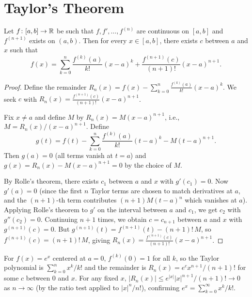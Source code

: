 \documentclass[11pt,a4paper]{article}
\begin{document}
\section{Taylor's Theorem}
\label{sec:taylor}

\begin{theorem}
\label{thm:taylor}
Let $f \colon [a, b] \to \mathbb{R}$ be such that $f, f', \ldots, f^{(n)}$ are
continuous on $[a, b]$ and $f^{(n+1)}$ exists on $(a, b)$. Then for every
$x \in [a, b]$, there exists $c$ between $a$ and $x$ such that
\[
  f(x) = \sum_{k=0}^{n} \frac{f^{(k)}(a)}{k!}(x - a)^k
  + \frac{f^{(n+1)}(c)}{(n+1)!}(x - a)^{n+1}.
\]
\end{theorem}

\begin{proof}
Define the remainder $R_n(x) = f(x) - \sum_{k=0}^n
\frac{f^{(k)}(a)}{k!}(x-a)^k$. We seek $c$ with
$R_n(x) = \frac{f^{(n+1)}(c)}{(n+1)!}(x-a)^{n+1}$.

Fix $x \neq a$ and define $M$ by $R_n(x) = M(x - a)^{n+1}$, i.e.,
$M = R_n(x)/(x - a)^{n+1}$. Define
\[
  g(t) = f(t) - \sum_{k=0}^{n} \frac{f^{(k)}(a)}{k!}(t - a)^k
  - M(t - a)^{n+1}.
\]
Then $g(a) = 0$ (all terms vanish at $t = a$) and $g(x) = R_n(x) -
M(x - a)^{n+1} = 0$ by the choice of $M$.

By Rolle's theorem, there exists $c_1$ between $a$ and $x$ with
$g'(c_1) = 0$. Now $g'(a) = 0$ (since the first $n$ Taylor terms are
chosen to match derivatives at $a$, and the $(n+1)$-th term contributes
$(n+1)M(t-a)^n$ which vanishes at $a$). Applying Rolle's theorem to
$g'$ on the interval between $a$ and $c_1$, we get $c_2$ with
$g''(c_2) = 0$. Continuing $n+1$ times, we obtain $c = c_{n+1}$ between
$a$ and $x$ with $g^{(n+1)}(c) = 0$. But
$g^{(n+1)}(t) = f^{(n+1)}(t) - (n+1)!\,M$,
so $f^{(n+1)}(c) = (n+1)!\,M$, giving
$R_n(x) = \frac{f^{(n+1)}(c)}{(n+1)!}(x - a)^{n+1}$.
\end{proof}

\begin{example}
\label{ex:taylor_exp}
For $f(x) = e^x$ centered at $a = 0$, $f^{(k)}(0) = 1$ for all $k$,
so the Taylor polynomial is $\sum_{k=0}^n x^k / k!$ and the remainder
is $R_n(x) = e^c x^{n+1}/(n+1)!$ for some $c$ between $0$ and $x$.
For any fixed $x$, $|R_n(x)| \le e^{|x|} |x|^{n+1}/(n+1)! \to 0$
as $n \to \infty$ (by the ratio test applied to $|x|^n/n!$), confirming
$e^x = \sum_{k=0}^\infty x^k/k!$.
\end{example}
\end{document}
